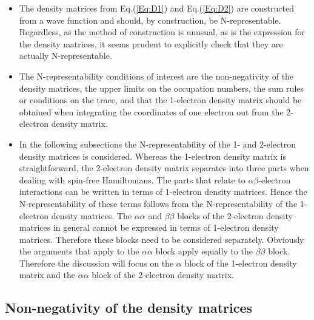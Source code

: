 \documentclass[aip,graphicx]{revtex4-1}
\begin{document}
\begin{itemize}
    \item The density matrices from Eq.(\ref{Eq:D1}) and Eq.(\ref{Eq:D2}) are constructed from a wave function and should, by construction, be N-representable. Regardless, as the method of construction is unusual, as is the expression for the density matrices, it seems prudent to explicitly check that they are actually N-representable. 
    
    \item The N-representability conditions of interest are the non-negativity of the density matrices, the upper limits on the occupation numbers, the sum rules or conditions on the trace, and that the 1-electron density matrix should be obtained when integrating the coordinates of one electron out from the 2-electron density matrix. 
    
    \item In the following subsections the N-representability of the 1- and 2-electron density matrices is considered. Whereas the 1-electron density matrix is straightforward, the 2-electron density matrix separates into three parts when dealing with spin-free Hamiltonians. The parts that relate to $\alpha\beta$-electron interactions can be written in terms of 1-electron density matrices. Hence the N-representability of these terms follows from the N-representability of the 1-electron density matrices. The $\alpha\alpha$ and $\beta\beta$ blocks of the 2-electron density matrices in general cannot be expressed in terms of 1-electron density matrices. Therefore these blocks need to be considered separately. Obviously the arguments that apply to the $\alpha\alpha$ block apply equally to the $\beta\beta$ block. Therefore the discussion will focus on the $\alpha$ block of the 1-electron density matrix and the $\alpha\alpha$ block of the 2-electron density matrix.
\end{itemize}
    
\subsection{Non-negativity of the density matrices}
\end{document}
